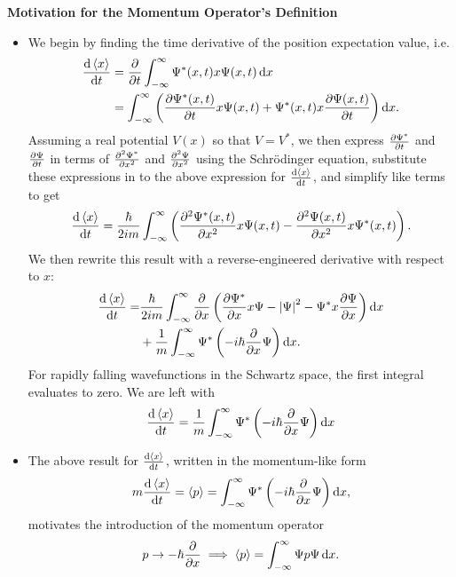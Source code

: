 \documentclass[11pt, a4paper]{article}
\newcommand{\diff}{\mathop{}\!\mathrm{d}} %
\newcommand{\Schro}{Schr\"{o}dinger\xspace}
\renewcommand{\P}{\Psi}  %
\begin{document}
\textbf{Motivation for the Momentum Operator's Definition}
\begin{itemize}
	\item We begin by finding the time derivative of the position expectation value, i.e.
	\begin{align*}
		\dv{\ev{x}}{t} &= \pdv{t}\int_{-\infty}^{\infty} \Psi^{*}(x, t)x\Psi(x,t)\diff x \\
		&= \int_{-\infty}^{\infty} \left(\pdv{\P^{*}(x, t)}{t} x \P(x, t) + \P^{*}(x, t)x\pdv{\P(x, t)}{t}\right)\diff x.
	\end{align*}
    Assuming a real potential $ V(x) $ so that $ V = V^{*} $, we then express $ \pdv{\P^{*}}{t} $ and $ \pdv{\P}{t} $ in terms of $ \pdv[2]{\P^{*}}{x} $ and $ \pdv[2]{\P}{x} $ using the \Schro equation, substitute these expressions in to the above expression for $ \dv{\ev{x}}{t} $, and simplify like terms to get
	\begin{equation*}
		\dv{\ev{x}}{t} = \frac{\hbar}{2im}\int_{-\infty}^{\infty} \left( \pdv[2]{\P^{*}(x, t)}{x} x \P(x, t) - \pdv[2]{\P(x, t)}{x} x \P^{*}(x, t) \right).
	\end{equation*}
	We then rewrite this result with a reverse-engineered derivative with respect to $ x $:
	\begin{align*}
		\dv{\ev{x}}{t} = & \frac{\hbar}{2im} \int_{-\infty}^{\infty} \pdv{x}\left(\pdv{\P^{*}}{x}x\P - \abs{\P}^{2} - \P^{*}x\pdv{\P}{x}\right)\diff x\\
		& + \frac{1}{m} \int_{-\infty}^{\infty} \P^{*} \left(-i\hbar \pdv{x}\P\right)\diff x.
	\end{align*}
	For rapidly falling wavefunctions in the Schwartz space, the first integral evaluates to zero. We are left with
	\begin{equation*}
		\dv{\ev{x}}{t} = \frac{1}{m} \int_{-\infty}^{\infty} \P^{*} \left(-i\hbar \pdv{x}\P\right)\diff x
	\end{equation*}
	
	\item The above result for $ \dv{\ev{x}}{t} $, written in the momentum-like form
	\begin{equation*}
		m \dv{\ev{x}}{t} = \ev{p} = \int_{-\infty}^{\infty} \P^{*} \left(-i\hbar \pdv{x}\P\right)\diff x,
	\end{equation*}
	motivates the introduction of the momentum operator
	\begin{equation*}
		p \to - \hbar \pdv{x} \implies \ev{p} = \int_{-\infty}^{\infty} \P p \P \diff x.
	\end{equation*}
\end{itemize}
\end{document}
